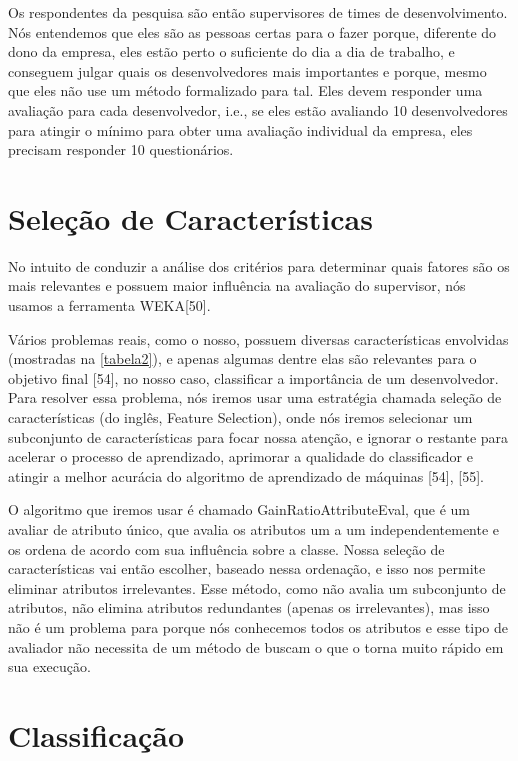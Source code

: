 Os respondentes da pesquisa são então supervisores de times de desenvolvimento. Nós entendemos que eles são as pessoas certas para o fazer porque, diferente do dono da empresa, eles estão perto o suficiente do dia a dia de trabalho, e conseguem julgar quais os desenvolvedores mais importantes e porque, mesmo que eles não use um método formalizado para tal. Eles devem responder uma avaliação para cada desenvolvedor, i.e., se eles estão avaliando 10 desenvolvedores para atingir o mínimo para obter uma avaliação individual da empresa, eles precisam responder 10 questionários.

\section{Seleção de Características}\label{secao3.3}
No intuito de conduzir a análise dos critérios para determinar quais fatores são os mais relevantes e possuem maior influência na avaliação do supervisor, nós usamos a ferramenta WEKA[50].

Vários problemas reais, como o nosso, possuem diversas características envolvidas (mostradas na \autoref{tabela2}), e apenas algumas dentre elas são relevantes para o objetivo final [54], no nosso caso, classificar a importância de um desenvolvedor. Para resolver essa problema, nós iremos usar uma estratégia chamada seleção de características (do inglês, Feature Selection), onde nós iremos selecionar um subconjunto de características para focar nossa atenção, e ignorar o restante para acelerar o processo de aprendizado, aprimorar a qualidade do classificador e atingir a melhor acurácia do algoritmo de aprendizado de máquinas [54], [55]. 

O algoritmo que iremos usar é chamado GainRatioAttributeEval, que é um avaliar de atributo único, que avalia os atributos um a um independentemente e os ordena de acordo com sua influência sobre a classe. Nossa seleção de características vai então escolher, baseado nessa ordenação, e isso nos permite eliminar atributos irrelevantes. Esse método, como não avalia um subconjunto de atributos, não elimina atributos redundantes (apenas os irrelevantes),  mas isso não é um problema para  porque nós conhecemos todos os atributos e esse tipo de avaliador não necessita de um método de buscam o que o torna muito rápido em sua execução.

\section{Classificação}\label{secao3.4}

